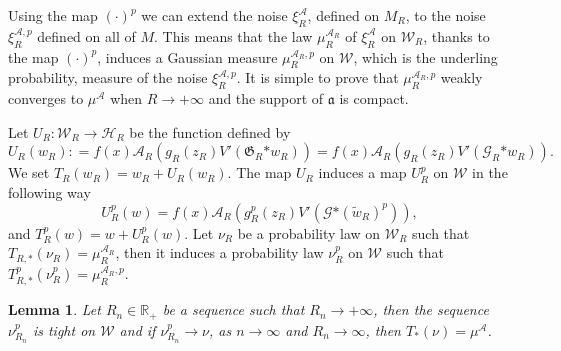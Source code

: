\documentclass[a4paper,10pt]{article}
\newcommand{\asterisk}{\mathord{*}}
\newtheorem{lemma}[theorem]{Lemma}
\begin{document}
Using the map $(\cdot)^p$ we can extend the noise $\xi^{\mathcal{A}}_R$,
defined on $M_R$, to the noise $\xi^{\mathcal{A}, p}_R$ defined on all of $M$.
This means that the law $\mu^{\mathcal{A}_R}_R$ of $\xi^{\mathcal{A}}_R$ on
$\mathcal{W}_R$, thanks to the map $(\cdot)^p$, induces a Gaussian measure
$\mu^{\mathcal{A}_R, p}_R$ on $\mathcal{W}$, which is the underling
probability, measure of the noise $\xi^{\mathcal{A}, p}_R$. It is simple to
prove that $\mu^{\mathcal{A}_R, p}_R$ weakly converges to $\mu^{\mathcal{A}}$
when $R \rightarrow + \infty$ and the support of $\mathfrak{a}$ is compact.

Let $U_R : \mathcal{W}_R \rightarrow \mathcal{H}_R$ be the function defined
by
\[ U_R (w_R) : = f (x) \mathcal{A}_R (g_R (z_R) V' (\mathfrak{G}_R \asterisk
   w_R)) = f (x) \mathcal{A}_R (g_R (z_R) V' (\mathcal{G}_R \asterisk w_R)) .
\]
We set $T_R (w_R) = w_R + U_R (w_R)$. The map $U_R$ induces a map $U_R^p$
on $\mathcal{W}$ in the following way
\[ U_R^p (w) = f (x) \mathcal{A}_R (g_R^p (z_R) V' (\mathcal{G} \asterisk
   (\tilde{w}_R)^p)), \]
and $T^p_R (w) = w + U^p_R (w)$. Let $\nu_R$ be a probability law on
$\mathcal{W}_R$ such that $T_{R, \asterisk} (\nu_R) = \mu^{\mathcal{A}_R}_R$,
then it induces a probability law $\nu^p_R$ on $\mathcal{W}$ such that
$T^p_{R, \ast} (\nu_R^p) = \mu^{\mathcal{A}_R, p}_R$.

\begin{lemma}
  \label{lemma_extension1}Let $R_n \in \mathbb{R}_+$ be a sequence such that
  $R_n \rightarrow + \infty$, then the sequence $\nu_{R_n}^p$ is tight on
  $\mathcal{W}$ and if $\nu_{R_n}^p \rightarrow \nu$, as $n \rightarrow
  \infty$ and $R_n \rightarrow \infty$, then $T_{\asterisk} (\nu) =
  \mu^{\mathcal{A}}$.
\end{lemma}
\end{document}
